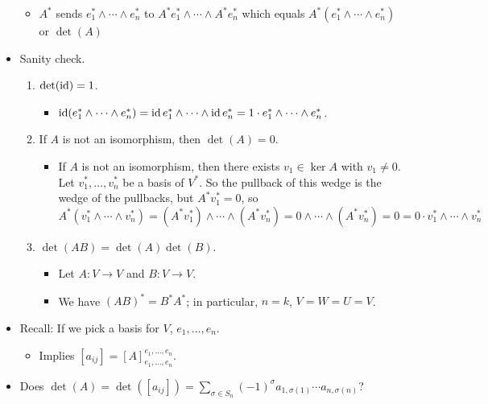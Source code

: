 \documentclass[../notes.tex]{subfiles}
\begin{document}
\begin{itemize}
    \begin{itemize}
        \item $A^*$ sends $e_1^*\wedge\cdots\wedge e_n^*$ to $A^*e_1^*\wedge\cdots\wedge A^*e_n^*$ which equals $A^*(e_1^*\wedge\cdots\wedge e_n^*)$ or $\det(A)$
    \end{itemize}
    \item Sanity check.
    \begin{enumerate}
        \item $\det(\operatorname{id})=1$.
        \begin{itemize}
            \item $\operatorname{id}(e_1^*\wedge\cdots\wedge e_n^*)=\operatorname{id} e_1^*\wedge\cdots\wedge\operatorname{id} e_n^*=1\cdot e_1^*\wedge\cdots\wedge e_n^*$.
        \end{itemize}
        \item If $A$ is not an isomorphism, then $\det(A)=0$.
        \begin{itemize}
            \item If $A$ is not an isomorphism, then there exists $v_1\in\ker A$ with $v_1\neq 0$. Let $v_1^*,\dots,v_n^*$ be a basis of $V^*$. So the pullback of this wedge is the wedge of the pullbacks, but $A^*v_1^*=0$, so
            \begin{equation*}
                A^*(v_1^*\wedge\cdots\wedge v_n^*) = (A^*v_1^*)\wedge\cdots\wedge(A^*v_n^*)
                = 0\wedge\cdots\wedge(A^*v_n^*)
                = 0
                = 0\cdot v_1^*\wedge\cdots\wedge v_n^*
            \end{equation*}
        \end{itemize}
        \item $\det(AB)=\det(A)\det(B)$.
        \begin{itemize}
            \item Let $A:V\to V$ and $B:V\to V$.
            \item We have $(AB)^*=B^*A^*$; in particular, $n=k$, $V=W=U=V$.
        \end{itemize}
    \end{enumerate}
    \item Recall: If we pick a basis for $V$, $e_1,\dots,e_n$.
    \begin{itemize}
        \item Implies $[a_{ij}]=[A]_{e_1,\dots,e_n}^{e_1,\dots,e_n}$.
    \end{itemize}
    \item Does $\det(A)=\det([a_{ij}])=\sum_{\sigma\in S_n}(-1)^\sigma a_{1,\sigma(1)}\cdots a_{n,\sigma(n)}$?

\end{itemize}
\end{document}

